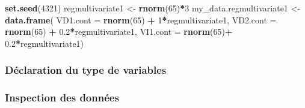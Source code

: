 \documentclass[
]{book}
\newenvironment{Shaded}{\begin{snugshade}}{\end{snugshade}}
\newcommand{\DataTypeTok}[1]{\textcolor[rgb]{0.13,0.29,0.53}{#1}}
\newcommand{\DecValTok}[1]{\textcolor[rgb]{0.00,0.00,0.81}{#1}}
\newcommand{\FloatTok}[1]{\textcolor[rgb]{0.00,0.00,0.81}{#1}}
\newcommand{\KeywordTok}[1]{\textcolor[rgb]{0.13,0.29,0.53}{\textbf{#1}}}
\newcommand{\NormalTok}[1]{#1}
\newcommand{\OperatorTok}[1]{\textcolor[rgb]{0.81,0.36,0.00}{\textbf{#1}}}
\newcommand{\StringTok}[1]{\textcolor[rgb]{0.31,0.60,0.02}{#1}}
\begin{document}
\begin{Shaded}
\begin{Highlighting}[]
\KeywordTok{set.seed}\NormalTok{(}\DecValTok{4321}\NormalTok{)}
\NormalTok{regmultivariate1 <-}\StringTok{ }\KeywordTok{rnorm}\NormalTok{(}\DecValTok{65}\NormalTok{)}\OperatorTok{*}\DecValTok{3}
\NormalTok{my_data.regmultivariate1 <-}\StringTok{ }\KeywordTok{data.frame}\NormalTok{(}
  \DataTypeTok{VD1.cont =} \KeywordTok{rnorm}\NormalTok{(}\DecValTok{65}\NormalTok{) }\OperatorTok{+}\StringTok{ }\DecValTok{1}\OperatorTok{*}\NormalTok{regmultivariate1,}
  \DataTypeTok{VD2.cont =} \KeywordTok{rnorm}\NormalTok{(}\DecValTok{65}\NormalTok{) }\OperatorTok{+}\StringTok{ }\FloatTok{0.2}\OperatorTok{*}\NormalTok{regmultivariate1,}
  \DataTypeTok{VI1.cont =} \KeywordTok{rnorm}\NormalTok{(}\DecValTok{65}\NormalTok{)}\OperatorTok{+}\StringTok{ }\FloatTok{0.2}\OperatorTok{*}\NormalTok{regmultivariate1)}
\end{Highlighting}
\end{Shaded}

\hypertarget{duxe9claration-du-type-de-variables-20}{%
\subsubsection{Déclaration du type de variables}\label{duxe9claration-du-type-de-variables-20}}

\begin{Shaded}
\end{Shaded}

\hypertarget{inspection-des-donnuxe9es-20}{%
\subsubsection{Inspection des données}\label{inspection-des-donnuxe9es-20}}
\end{document}
